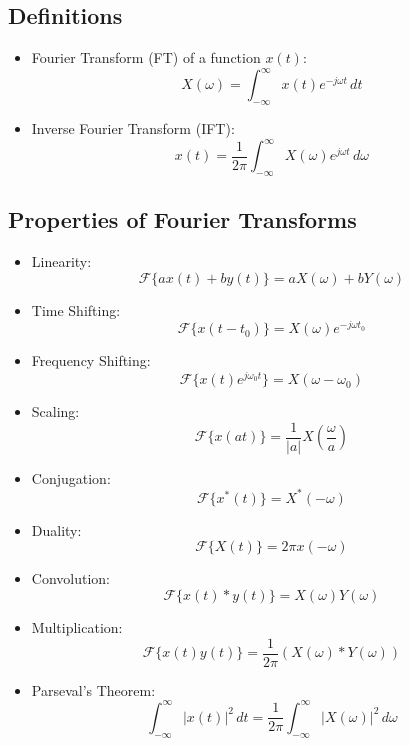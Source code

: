 \documentclass[12pt]{article}
\begin{document}
\subsection{Definitions}
\begin{itemize}
    \item Fourier Transform (FT) of a function \( x(t) \):
    \[
    X(\omega) = \int_{-\infty}^{\infty} x(t) e^{-j\omega t} \, dt
    \]
    \item Inverse Fourier Transform (IFT):
    \[
    x(t) = \frac{1}{2\pi} \int_{-\infty}^{\infty} X(\omega) e^{j\omega t} \, d\omega
    \]
\end{itemize}

\subsection{Properties of Fourier Transforms}
\begin{itemize}
    \item Linearity:
    \[
    \mathcal{F}\{a x(t) + b y(t)\} = a X(\omega) + b Y(\omega)
    \]
    \item Time Shifting:
    \[
    \mathcal{F}\{x(t - t_0)\} = X(\omega) e^{-j\omega t_0}
    \]
    \item Frequency Shifting:
    \[
    \mathcal{F}\{x(t) e^{j\omega_0 t}\} = X(\omega - \omega_0)
    \]
    \item Scaling:
    \[
    \mathcal{F}\{x(at)\} = \frac{1}{|a|} X\left(\frac{\omega}{a}\right)
    \]
    \item Conjugation:
    \[
    \mathcal{F}\{x^*(t)\} = X^*(-\omega)
    \]
    \item Duality:
    \[
    \mathcal{F}\{X(t)\} = 2\pi x(-\omega)
    \]
    \item Convolution:
    \[
    \mathcal{F}\{x(t) * y(t)\} = X(\omega) Y(\omega)
    \]
    \item Multiplication:
    \[
    \mathcal{F}\{x(t) y(t)\} = \frac{1}{2\pi} \left( X(\omega) * Y(\omega) \right)
    \]
    \item Parseval’s Theorem:
    \[
    \int_{-\infty}^{\infty} |x(t)|^2 \, dt = \frac{1}{2\pi} \int_{-\infty}^{\infty} |X(\omega)|^2 \, d\omega
    \]
\end{itemize}
\end{document}
